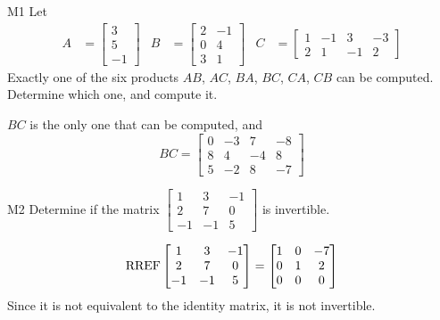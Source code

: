 \documentclass{sbgLAsemi}
\begin{document}
\begin{problem}{M1}
Let 
\begin{align*}
A &= \begin{bmatrix} 3 \\ 5 \\ -1  \end{bmatrix} & B &= \begin{bmatrix} 2 & -1 \\ 0 & 4 \\ 3 & 1 \end{bmatrix} & C&=\begin{bmatrix} 1 & -1 & 3 & -3 \\ 2 & 1 & -1 & 2 \end{bmatrix}
\end{align*}
Exactly one of the six products $AB$, $AC$, $BA$, $BC$, $CA$, $CB$ can be computed.  Determine which one, and compute it.
\end{problem}
\begin{solution}
$BC$ is the only one that can be computed, and
$$BC=\begin{bmatrix} 0 & -3 & 7 & -8 \\ 8 & 4 & -4 & 8 \\ 5 & -2 & 8 & -7 \end{bmatrix}$$
\end{solution}

\begin{problem}{M2} Determine if the matrix $\begin{bmatrix} 1 & 3 & -1 \\ 2 & 7 & 0 \\ -1 & -1 & 5 \end{bmatrix}$ is invertible.
\end{problem}
\begin{solution}
$$\operatorname{RREF}\begin{bmatrix} 1 & 3 & -1 \\ 2 & 7 & 0 \\ -1 & -1 & 5 \end{bmatrix} =\begin{bmatrix} 1 & 0 & -7 \\ 0 & 1 & 2 \\ 0 & 0 & 0 \end{bmatrix}$$ 
Since it is not equivalent to the identity matrix, it is not invertible.
\end{solution}
\end{document}

